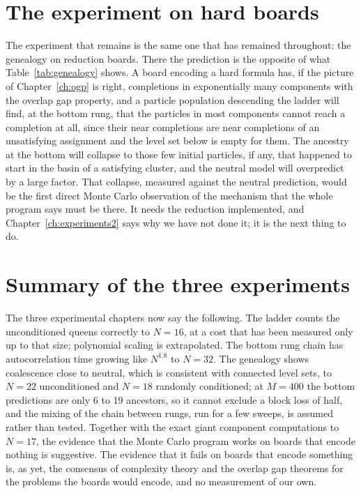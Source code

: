 \section{The experiment on hard boards}

The experiment that remains is the same one that has remained throughout: the genealogy on reduction boards. There the prediction is the opposite of what Table~\ref{tab:genealogy} shows. A board encoding a hard formula has, if the picture of Chapter~\ref{ch:ogp} is right, completions in exponentially many components with the overlap gap property, and a particle population descending the ladder will find, at the bottom rung, that the particles in most components cannot reach a completion at all, since their near completions are near completions of an unsatisfying assignment and the level set below is empty for them. The ancestry at the bottom will collapse to those few initial particles, if any, that happened to start in the basin of a satisfying cluster, and the neutral model will overpredict by a large factor. That collapse, measured against the neutral prediction, would be the first direct Monte Carlo observation of the mechanism that the whole program says must be there. It needs the reduction implemented, and Chapter~\ref{ch:experiments2} says why we have not done it; it is the next thing to do.

\section{Summary of the three experiments}

The three experimental chapters now say the following. The ladder counts the unconditioned queens correctly to $N = 16$, at a cost that has been measured only up to that size; polynomial scaling is extrapolated. The bottom rung chain has autocorrelation time growing like $N^{1.8}$ to $N = 32$. The genealogy shows coalescence close to neutral, which is consistent with connected level sets, to $N = 22$ unconditioned and $N = 18$ randomly conditioned; at $M = 400$ the bottom predictions are only 6 to 19 ancestors, so it cannot exclude a block loss of half, and the mixing of the chain between rungs, run for a few sweeps, is assumed rather than tested. Together with the exact giant component computations to $N = 17$, the evidence that the Monte Carlo program works on boards that encode nothing is suggestive. The evidence that it fails on boards that encode something is, as yet, the consensus of complexity theory and the overlap gap theorems for the problems the boards would encode, and no measurement of our own.
